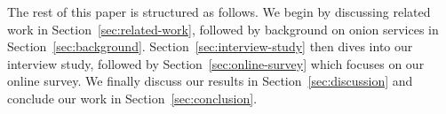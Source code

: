 The rest of this paper is structured as follows.  We begin by discussing related
work in Section~\ref{sec:related-work}, followed by background on onion services
in Section~\ref{sec:background}.  Section~\ref{sec:interview-study} then dives
into our interview study, followed by Section~\ref{sec:online-survey} which
focuses on our online survey.  We finally discuss our results in
Section~\ref{sec:discussion} and conclude our work in
Section~\ref{sec:conclusion}.
